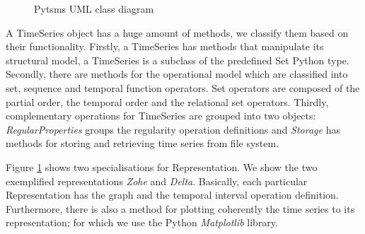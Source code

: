 \begin{figure}[tp]
  \centering



  \caption{Pytsms UML class diagram}
  \label{fig:implementacio:pytsms-uml}
\end{figure}




A TimeSeries object has a huge amount of methods, we classify them
based on their functionality. Firstly, a TimeSeries has methods that
manipulate its structural model, a TimeSeries is a subclass of the
predefined Set Python type. Secondly, there are methods for the
operational model which are classified into set, sequence and temporal
function operators.  Set operators are composed of the partial order,
the temporal order and the relational set operators.  Thirdly,
complementary operations for TimeSeries are grouped into two objects:
\emph{RegularProperties} groups the regularity operation definitions
and \emph{Storage} has methods for storing and retrieving time series
from file system.


Figure \ref{fig:implementacio:pytsms-uml} shows two specialisations
for Representation. We show the two exemplified representations
\emph{Zohe} and \emph{Delta}. Basically, each particular
Representation has the graph and the temporal interval operation
definition. Furthermore, there is also a method for plotting
coherently the time series to its representation; for which we use the
Python \emph{Matplotlib} library.



